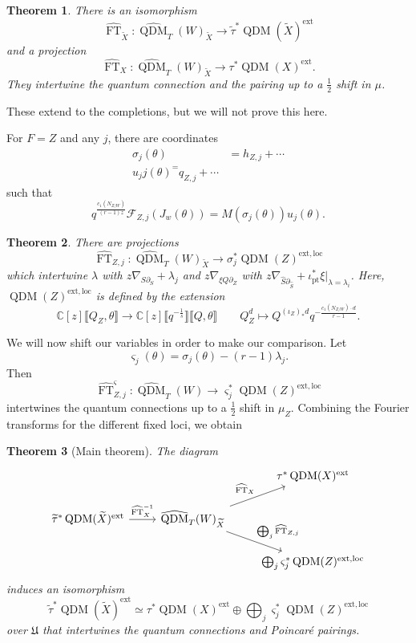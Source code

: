 \documentclass[leqno, openany]{memoir}
\newtheorem{thm}{Theorem}[section]
\theoremstyle{definition}
\theoremstyle{remark}
\theoremstyle{plain}
\theoremstyle{definition}
\theoremstyle{remark}
\newcommand{\C}{\mathbb{C}}
\newcommand{\mc}[1]{\mathcal{#1}}
\newcommand{\mf}[1]{\mathfrak{#1}}
\newcommand{\mr}[1]{\mathrm{#1}}
\newcommand{\on}[1]{\operatorname{#1}}
\newcommand{\wt}[1]{\widetilde{#1}}
\newcommand{\wh}[1]{\widehat{#1}}
\DeclareMathOperator{\QDM}{QDM}
\begin{document}
\begin{thm}
    There is an isomorphism
    \[ \wh{\on{FT}}_{\wt{X}} \colon \wh{\QDM}_T(W)_{\wt{X}} \to \wt{\tau}^* \QDM(\wt{X})^{\on{ext}} \]
    and a projection
    \[ \wh{\on{FT}}_X \colon \wh{\QDM}_T(W)_{\wt{X}} \to \tau^* \QDM(X)^{\on{ext}}. \]
    They intertwine the quantum connection and the pairing up to a $\frac{1}{2}$ shift in $\mu$.
\end{thm}

These extend to the completions, but we will not prove this here.

For $F=Z$ and any $j$, there are coordinates
\begin{align*}
    \sigma_j(\theta) &= h_{Z,j} + \cdots \\
    u_jj(\theta) ^= q_{Z,j} + \cdots
\end{align*}
such that
\[ q^{\frac{c_1(N_{Z/W})}{(r-1)z}} \mc{F}_{Z,j}(J_w(\theta)) = M(\sigma_j(\theta))u_j(\theta). \]

\begin{thm}
    There are projections
    \[ \wh{\on{FT}}_{Z,j} \colon \wh{\QDM}_T(W)_{\wt{X}} \to \sigma_j^* \QDM(Z)^{\mr{ext,loc}} \]
    which intertwine $\lambda$ with $z \nabla_{S \partial_S} + \lambda_j$ and $z \nabla_{\xi Q \partial_Z}$ with $z \nabla_{\wh{S} \partial_{\wh{S}}} + \iota_{\mr{pt}}^* \xi |_{\lambda = \lambda_i}$. Here, $\QDM(Z)^{\mr{ext,loc}}$ is defined by the extension
    \[ \C[z] \llbracket Q_Z, \theta \rrbracket \to \C[z] \llbracket q^{-\frac{1}{s}} \rrbracket \llbracket Q, \theta \rrbracket \qquad Q_Z^d \mapsto Q^{(\iota_Z)_* d} q^{-\frac{c_1(N_{Z/W})\cdot d}{r-1}}. \]
\end{thm}

We will now shift our variables in order to make our comparison. Let
\[ \varsigma_j(\theta) = \sigma_j(\theta) - (r-1)\lambda_j. \]
Then
\[ \wh{\on{FT}}_{Z,j}^{\varsigma} \colon \wh{\QDM}_T(W) \to \varsigma_j^* \QDM(Z)^{\mr{ext,loc}} \]
intertwines the quantum connections up to a $\frac{1}{2}$ shift in $\mu_Z$. Combining the Fourier transforms for the different fixed loci, we obtain

\begin{thm}[Main theorem]\label{thm:main}
    The diagram
    \begin{equation*}
    \begin{tikzcd}
        & & \tau^* \QDM(X)^{\mr{ext}} \\
        \wt{\tau}^* \QDM(\wt{X})^{\mr{ext}} \ar{r}{\wh{\on{FT}}_X^{-1}} & \wh{\QDM}_T(W)_{\wt{X}} \ar{ur}{\wh{\on{FT}}_X} \ar{dr}{\bigoplus_j \wh{\on{FT}}_{Z,j}}  \\
        & & \bigoplus_j \varsigma_j^* \QDM(Z)^{\mr{ext,loc}}
    \end{tikzcd}
    \end{equation*}
    induces an isomorphism
    \[ \wt{\tau}^* \QDM(\wt{X})^{\mr{ext}} \simeq \tau^* \QDM(X)^{\mr{ext}} \oplus \bigoplus_j \varsigma_j^* \QDM(Z)^{\mr{ext,loc}} \]
    over $\mf{U}$ that intertwines the quantum connections and Poincar\'e pairings.
\end{thm}
\end{document}
